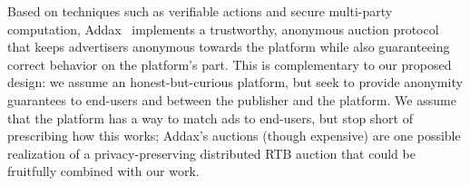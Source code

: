 %
Based on techniques such as verifiable actions and secure multi-party computation, Addax~\cite{addax} implements a trustworthy, anonymous auction protocol that keeps advertisers anonymous towards the platform while also guaranteeing correct behavior on the platform's part.
%
This is complementary to our proposed design: we assume an honest-but-curious platform, but seek to provide anonymity guarantees to end-users and between the publisher and the platform.
%
We assume that the platform has a way to match ads to end-users, but stop short of prescribing how this works; Addax's auctions (though expensive) are one possible realization of a privacy-preserving distributed RTB auction that could be fruitfully combined with our work.
%
%

%
%
